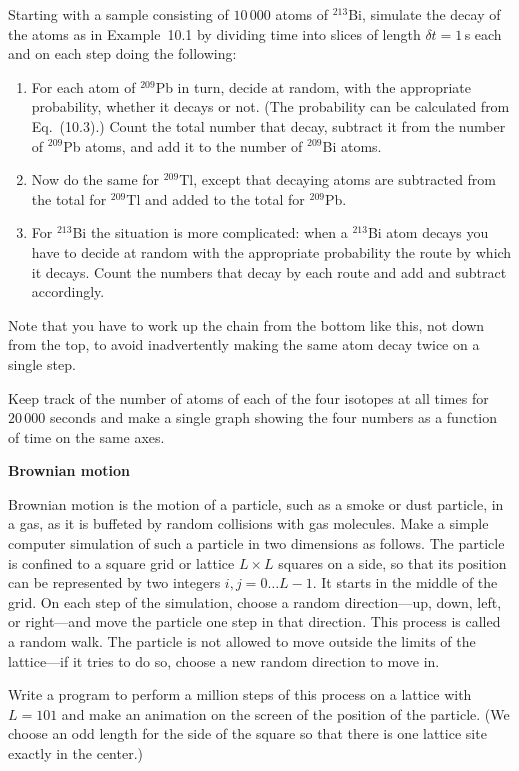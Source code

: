 \documentclass[12pt]{article}
\begin{document}
\begin{exercises}
Starting with a sample consisting of $10\,000$ atoms of $^{213}$Bi,
simulate the decay of the atoms as in Example~10.1 by dividing time into
slices of length $\delta t=1\,$s each and on each step doing the following:
\begin{enumerate}\setlength{\itemsep}{0pt}
\item For each atom of $^{209}$Pb in turn, decide at random, with the
  appropriate probability, whether it decays or not.  (The probability can
  be calculated from Eq.~(10.3).)  Count the total number that decay,
  subtract it from the number of $^{209}$Pb atoms, and add it to the number
  of $^{209}$Bi atoms.
\item Now do the same for $^{209}$Tl, except that decaying atoms are
  subtracted from the total for $^{209}$Tl and added to the total for
  $^{209}$Pb.
\item For $^{213}$Bi the situation is more complicated: when a $^{213}$Bi
  atom decays you have to decide at random with the appropriate probability
  the route by which it decays.  Count the numbers that decay by each route
  and add and subtract accordingly.
\end{enumerate}
Note that you have to work up the chain from the bottom like this, not down
from the top, to avoid inadvertently making the same atom decay twice on a
single step.

Keep track of the number of atoms of each of the four isotopes at all times
for $20\,000$ seconds and make a single graph showing the four numbers as a
function of time on the same axes.



\exercise \textbf{Brownian motion}

\exskip Brownian motion is the motion of a particle, such as a smoke or
dust particle, in a gas, as it is buffeted by random collisions with gas
molecules.  Make a simple computer simulation of such a particle in two
dimensions as follows.  The particle is confined to a square grid or
lattice $L\times L$ squares on a side, so that its position can be
represented by two integers $i,j = 0\ldots L-1$.  It starts in the middle
of the grid.  On each step of the simulation, choose a random
direction---up, down, left, or right---and move the particle one step in
that direction.  This process is called a random walk.  The particle is not
allowed to move outside the limits of the lattice---if it tries to do so,
choose a new random direction to move in.

Write a program to perform a million steps of this process on a lattice
with $L=101$ and make an animation on the screen of the position of the
particle.  (We choose an odd length for the side of the square so that
there is one lattice site exactly in the center.)


\end{exercises}
\end{document}
